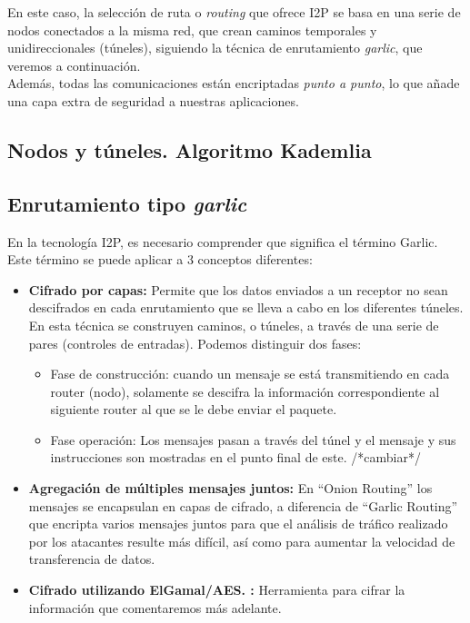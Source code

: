 En este caso, la selección de ruta o \textit{routing} que ofrece I2P se basa en una serie de nodos conectados a la misma red, que crean caminos temporales y unidireccionales (túneles), siguiendo la técnica de enrutamiento \textit{garlic}, que veremos a continuación.\\

Además, todas las comunicaciones están encriptadas \textit{punto a punto}, lo que añade una capa extra de seguridad a nuestras aplicaciones.

\subsection{Nodos y túneles. Algoritmo Kademlia}






\subsection{Enrutamiento tipo \textit{garlic}}

En la tecnología I2P, es necesario comprender que significa el término Garlic. Este término se puede aplicar a 3 conceptos diferentes:

\begin{itemize}
\item \textbf{Cifrado por capas:}
Permite que los datos enviados a un receptor no sean descifrados en cada enrutamiento que se lleva a cabo en los diferentes túneles. 
En esta técnica se construyen caminos, o túneles, a través de una serie de pares (controles de entradas). Podemos distinguir dos fases:


\begin{itemize}
	\item Fase de construcción: cuando un mensaje se está transmitiendo en cada router (nodo), solamente se descifra la información correspondiente al siguiente router al que se le debe enviar el paquete.
	\item 
	Fase  operación: Los mensajes pasan a través del túnel y el mensaje y sus instrucciones son mostradas en el punto final de este. /*cambiar*/
	
	
\end{itemize}	




\item \textbf{Agregación de múltiples mensajes juntos:}
En “Onion Routing” los mensajes se encapsulan en capas de cifrado, a diferencia de “Garlic Routing” que encripta varios mensajes juntos para que el análisis de tráfico realizado por los atacantes resulte más difícil, así como para aumentar la velocidad de transferencia de datos.


\item \textbf{Cifrado utilizando ElGamal/AES. :}
Herramienta para cifrar la información que comentaremos más adelante.

\end{itemize}




